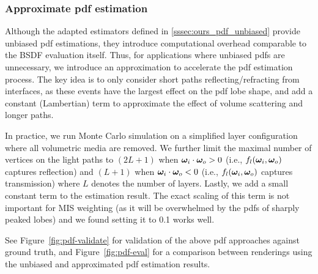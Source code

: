 
\subsubsection{Approximate pdf estimation}
\label{sssec:ours_pdf_approx}
%
Although the adapted estimators defined in \ref{sssec:ours_pdf_unbiased} provide unbiased pdf estimations, they introduce computational overhead comparable to the BSDF evaluation itself.
Thus, for applications where unbiased pdfs are unnecessary, we introduce an approximation to accelerate the pdf estimation process. The key idea is to only consider short paths reflecting/refracting from interfaces, as these events have the largest effect on the pdf lobe shape, and add a constant (Lambertian) term to approximate the effect of volume scattering and longer paths.

In practice, we run Monte Carlo simulation on a simplified layer configuration where all volumetric media are removed.
We further limit the maximal number of vertices on the light paths to $(2L + 1)$ when $\bm{\omega}_i \cdot \bm{\omega}_o > 0$ (i.e., $f_l(\bm{\omega}_i, \bm{\omega}_o)$ captures reflection) and $(L + 1)$ when $\bm{\omega}_i \cdot \bm{\omega}_o < 0$ (i.e., $f_l(\bm{\omega}_i, \bm{\omega}_o)$ captures transmission) where $L$ denotes the number of layers.
Lastly, we add a small constant term to the estimation result. The exact scaling of this term is not important for MIS weighting (as it will be overwhelmed by the pdfs of sharply peaked lobes) and we found setting it to 0.1 works well.

See Figure~\ref{fig:pdf-validate} for validation of the above pdf approaches against ground truth, and Figure~\ref{fig:pdf-eval} for a comparison between renderings using the unbiased and approximated pdf estimation results. 

